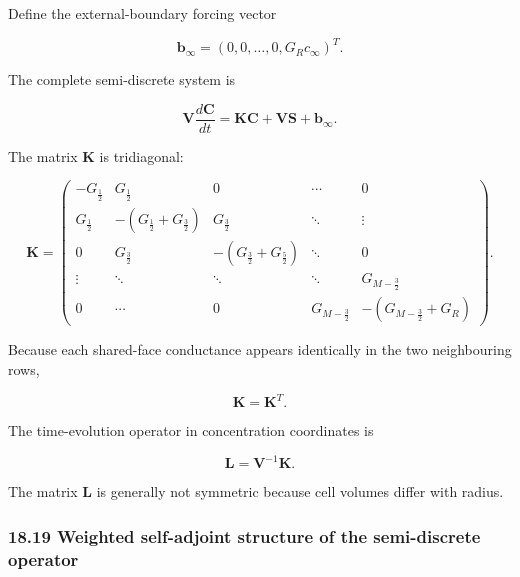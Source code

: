 \documentclass[11pt,a4paper]{article}
\begin{document}
Define the external-boundary forcing vector

\begin{equation}
\mathbf b_\infty
=
(0,0,\ldots,0,G_Rc_\infty)^T.
\tag{TRISO-FV-256}
\label{eq:triso-fv-256}
\end{equation}

The complete semi-discrete system is

\begin{equation}
\boxed{
\mathbf V
\frac{d\mathbf C}{dt}
=
\mathbf K\mathbf C
+
\mathbf V\mathbf S
+
\mathbf b_\infty.
}
\tag{TRISO-FV-257}
\label{eq:triso-fv-257}
\end{equation}

The matrix $\mathbf K$ is tridiagonal:

\begin{equation}
\mathbf K
=
\begin{pmatrix}
-G_{\frac12}
&
G_{\frac12}
&
0
&
\cdots
&
0
\\
G_{\frac12}
&
-(G_{\frac12}+G_{\frac32})
&
G_{\frac32}
&
\ddots
&
\vdots
\\
0
&
G_{\frac32}
&
-(G_{\frac32}+G_{\frac52})
&
\ddots
&
0
\\
\vdots
&
\ddots
&
\ddots
&
\ddots
&
G_{M-\frac32}
\\
0
&
\cdots
&
0
&
G_{M-\frac32}
&
-(G_{M-\frac32}+G_R)
\end{pmatrix}.
\tag{TRISO-FV-258}
\label{eq:triso-fv-258}
\end{equation}

Because each shared-face conductance appears identically in the two neighbouring rows,

\begin{equation}
\boxed{
\mathbf K=\mathbf K^T.
}
\tag{TRISO-FV-259}
\label{eq:triso-fv-259}
\end{equation}

The time-evolution operator in concentration coordinates is

\begin{equation}
\boxed{
\mathbf L
=
\mathbf V^{-1}\mathbf K.
}
\tag{TRISO-FV-260}
\label{eq:triso-fv-260}
\end{equation}

The matrix $\mathbf L$ is generally not symmetric because cell volumes differ with radius.

\subsubsection*{18.19 Weighted self-adjoint structure of the semi-discrete operator}
\end{document}
